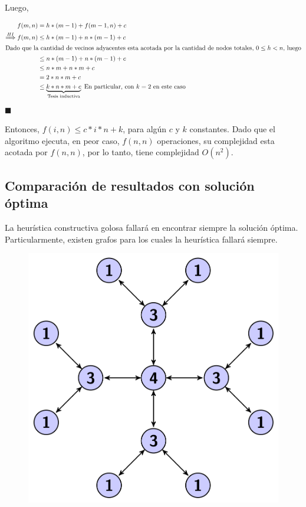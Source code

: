Luego,

\begin{align*}
f(m,n) & = h*(m-1) + f(m-1,n) + c \\
 \stackrel{HI}{\Longrightarrow} f(m,n) & \leq h*(m-1) + n*(m-1) + c \\
 \intertext{Dado que la cantidad de vecinos adyacentes esta acotada por la cantidad de nodos totales, $0 \leq h < n$, luego}
 & \leq n*(m-1)+n*(m-1) + c\\
 & \leq n*m + n*m + c\\
 & = 2*n*m + c\\
 & \leq \underbrace{k*n*m + c}_{\text{Tesis inductiva}} \text{       En particular, con $k = 2$ en este caso}
\end{align*}
\hfill $\blacksquare$

Entonces, $f(i,n) \leq c*i*n + k$, para algún $c$ y $k$ constantes.
Dado que el algoritmo ejecuta, en peor caso, $f(n,n)$ operaciones, su complejidad esta acotada por $f(n,n)$, por lo tanto, tiene complejidad $O(n^{2})$.\\

\subsection{Comparaci\'on de resultados con soluci\'on \'optima}
La heurística constructiva golosa fallará en encontrar siempre la solución óptima.
Particularmente, existen grafos para los cuales la heurística fallará siempre.\\
  \begin{figure}[h!]
   \begin{center}
 	\includegraphics[scale=0.4]{imagenes/maloGreedy.png}
   \end{center}
 \end{figure}

